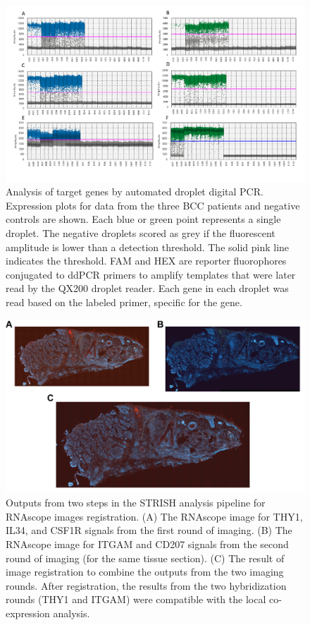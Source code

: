 \begin{figure}[htp]
\renewcommand{\figurename}{Supplementary Figure}
    \centering
    \includegraphics[width=0.75\columnwidth]{Chapter2/Figures/Supplemental_Fig_S6.png}
    \caption{Analysis of target genes by automated droplet digital PCR. Expression plots for data from the three BCC patients and negative controls are shown. Each blue or green point represents a single droplet. The negative droplets scored as grey if the fluorescent amplitude is lower than a detection threshold. The solid pink line indicates the threshold. FAM and HEX are reporter fluorophores conjugated to ddPCR primers to amplify templates that were later read by the QX200 droplet reader. Each gene in each droplet was read based on the labeled primer, specific for the gene.  }
    \label{fig:Chap2_Supfigure6}
\end{figure}
\begin{figure}[htp]
\renewcommand{\figurename}{Supplementary Figure}
    \centering
    \includegraphics[width=0.75\columnwidth]{Chapter2/Figures/Supplemental_Fig_S7.png}
    \caption{Outputs from two steps in the STRISH analysis pipeline for RNAscope images registration. (A) The RNAscope image for THY1, IL34, and CSF1R signals from the first round of imaging. (B) The RNAscope image for ITGAM and CD207 signals from the second round of imaging (for the same tissue section). (C) The result of image registration to combine the outputs from the two imaging rounds. After registration, the results from the two hybridization rounds (\ie THY1 and ITGAM) were compatible with the local co-expression analysis.}
    \label{fig:Chap2_Supfigure7}
\end{figure}
\typeout{}

% 

% 